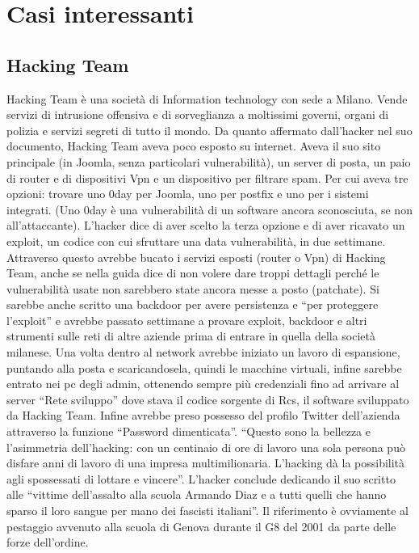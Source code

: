 \documentclass[8pt]{extarticle}
\begin{document}
\section{Casi interessanti}
\subsection{Hacking Team}
Hacking Team è una società di Information technology con sede a Milano. Vende servizi di intrusione offensiva e di 
sorveglianza a moltissimi governi, organi di polizia e servizi segreti di tutto il mondo. Da quanto affermato 
dall'hacker nel suo documento, Hacking Team aveva poco esposto su internet. Aveva il suo sito principale 
(in Joomla, senza particolari vulnerabilità), un server di posta, un paio di router e di dispositivi 
Vpn e un dispositivo per filtrare spam. Per cui aveva tre opzioni: trovare uno 0day per Joomla, 
uno per postfix e uno per i sistemi integrati. (Uno 0day è una vulnerabilità di un software ancora sconosciuta, se non all’attaccante). 
L’hacker dice di aver scelto la terza opzione e di aver ricavato un exploit, un codice con cui sfruttare una data 
vulnerabilità, in due settimane. Attraverso questo avrebbe bucato i servizi esposti (router o Vpn) di Hacking Team, 
anche se nella guida dice di non volere dare troppi dettagli perché le vulnerabilità usate 
non sarebbero state ancora messe a posto (patchate). Si sarebbe anche scritto una backdoor per avere persistenza 
e “per proteggere l’exploit” e avrebbe passato settimane a provare exploit, backdoor e altri strumenti sulle 
reti di altre aziende prima di entrare in quella della società milanese. Una volta dentro al network avrebbe 
iniziato un lavoro di espansione, puntando alla posta e scaricandosela, quindi le macchine virtuali, 
infine sarebbe entrato nei pc degli admin, ottenendo sempre più credenziali fino ad arrivare al server 
“Rete sviluppo” dove stava il codice sorgente di Rcs, il software sviluppato da Hacking Team. 
Infine avrebbe preso possesso del profilo Twitter dell’azienda attraverso la funzione “Password dimenticata”.
“Questo sono la bellezza e l’asimmetria dell’hacking: con un centinaio di ore di lavoro una sola persona può disfare 
anni di lavoro di una impresa multimilionaria. L’hacking dà la possibilità agli spossessati di lottare e vincere”.
L’hacker conclude dedicando il suo scritto alle “vittime dell’assalto alla scuola Armando Diaz e a tutti quelli 
che hanno sparso il loro sangue per mano dei fascisti italiani”. Il riferimento è ovviamente al pestaggio 
avvenuto alla scuola di Genova durante il G8 del 2001 da parte delle forze dell’ordine.
\end{document}
